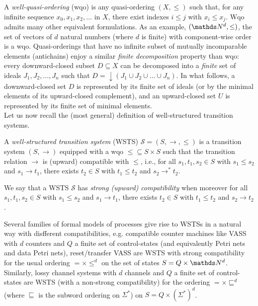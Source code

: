 \documentclass[runningheads]{llncs}
\begin{document}
 A {\em well-quasi-ordering} (wqo) is any quasi-ordering $(X,\leq)$ such that, for any infinite sequence $x_0, x_1, x_2, ...$ in $X$, there exist indexes $i \leq j$ with $x_i \leq  x_j$.
%
%
%
Wqo admits many other equivalent formulations. 
%
%
As an example, $(\N^d, \leq)$, the set of vectors of $d$ natural numbers (where $d$ is finite) with component-wise order is a wqo.
%
Quasi-orderings that have no 
infinite subset of mutually incomparable elements (antichains)
 enjoy a similar \emph{finite decomposition} property than wqo: every downward-closed subset $D \subseteq X$ can be decomposed into a \emph{finite} set of ideals $J_1, J_2, \ldots, J_n$ such that $D = \downarrow (J_1 \cup J_2 \cup \ldots \cup J_n)$.
%
%
In what follows, a downward-closed set $D$ is represented by its finite set of ideals (or by the minimal elements of its upward-closed complement), and an upward-closed set $U$ is represented by its finite set of minimal elements. \\

\noindent
Let us now recall the (most general) definition of well-structured transition systems.
\begin{definition}\cite{DBLP:journals/iandc/Finkel90,DBLP:journals/tcs/FinkelS01}
A {\em well-structured transition system} (WSTS)  $\mathscr{S}=(S, \rightarrow, \leq)$
is a transition system $(S, \rightarrow)$
equipped with a wqo ${\leq} \subseteq S \times S$ such that   
the transition relation $ \rightarrow$ is (upward) compatible with $\leq$, i.e., for all 
$s_1, t_1 , s_2 \in S$
	with $s_1 \leq s_2$  and $s_1 \rightarrow t_1$, there exists 
	$t_2 \in S$ with 
	$t_1 \leq t_2$ and $s_2 \rightarrow^{*} t_2$.
\end{definition}

We say that a WSTS $\mathscr{S}$ has \emph{strong (upward) compatibility} when moreover for all 
$s_1, t_1 , s_2 \in S$
	with $s_1 \leq s_2$  and $s_1 \rightarrow t_1$, there exists 
	$t_2 \in S$ with 
	$t_1 \leq t_2$ and $s_2 \rightarrow t_2$.

Several families of formal models of processes give rise to WSTSs in a natural way with disfferent compatibilities, e.g. compatible counter machines like VASS with $d$ counters and $Q$ a finite set of control-states (and equivalently Petri nets and data Petri nets), reset/transfer VASS are WSTS with strong compatibility for the usual ordering $=\times \leq^d$ on the set of states $S=Q \times \N^d$.
Similarly, lossy channel systems with $d$ channels and $Q$ a finite set of control-states are WSTS (with a non-strong compatibility)
for the ordering $=\times \sqsubseteq^d$ (where $\sqsubseteq$ is the subword ordering on $\Sigma^*$) on $S= Q \times (\Sigma^*)^d$.\\
\end{document}
